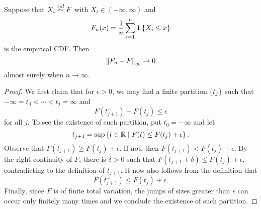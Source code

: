 \begin{theorem}
    Suppose that $X_i\overset{iid}{\sim} F$ with $X_i\in(-\infty, \infty)$ and 
    \begin{equation*}
        F_n(x) = \frac{1}{n}\sum_{i=1}^n\mathbf{1}\left\{ {X_i\leq x} \right\}
    \end{equation*}
    is the empirical CDF. Then 
    \begin{equation*}
        \left\lVert {F_n - F} \right\rVert_{\infty} \to 0
    \end{equation*}
    almost surely when $n\to\infty$. 
\end{theorem}
\begin{proof}
    We first claim that for $\epsilon>0$, we may find a finite partition 
    $\left\{ {t_j} \right\}$ such that $-\infty = t_0 <\cdots<t_j = \infty$ and 
    \begin{equation*}
        F(t_{j+1}^-) - F(t_j) \leq \epsilon
    \end{equation*}
    for all $j$. To see the existence of such partition, put 
    $t_0 = -\infty$ and let 
    \begin{equation*}
        t_{j+1} = \sup\left\{ t\in\mathbb{R} \;\middle\vert\; F(t)\leq F(t_j)+\epsilon \right\}. 
    \end{equation*}
    Observe that $F(t_{j+1})\geq F(t_j) + \epsilon$. If not, 
    then $F(t_{j+1}) < F(t_j) + \epsilon$. By the right-continuity 
    of $F$, there is $\delta > 0$ such that $F(t_{j+1} + \delta)\leq F(t_j) + \epsilon$, 
    contradicting to the definition of $t_{j+1}$. It now also 
    follows from the definition that 
    \begin{equation*}
        F(t_{j+1}^-) \leq F(t_j) + \epsilon. 
    \end{equation*}
    Finally, since $F$ is of finite total variation, the 
    jumps of sizes greater than $\epsilon$ can occur only 
    finitely many times and we conclude the existence of such 
    partition. 


\end{proof}
